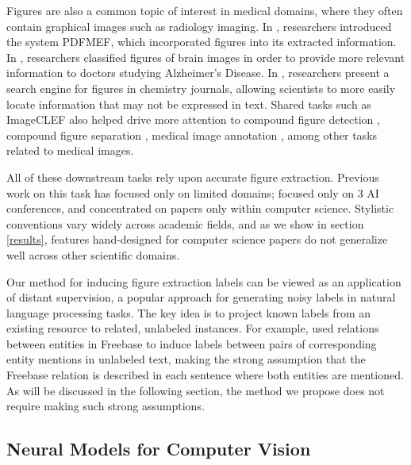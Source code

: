 \documentclass[sigconf]{acmart}
\begin{document}
Figures are also a common topic of interest in medical domains, where they often contain graphical images such as radiology imaging. In \cite{Wu2015PDFMEFAM}, researchers introduced the system PDFMEF, which incorporated figures into its extracted information. In \cite{Tsutsui2016AnalyzingFO}, researchers classified figures of brain images in order to provide more relevant information to doctors studying Alzheimer's Disease. In \cite{Choudhury2013AFS}, researchers present a search engine for figures in chemistry journals, allowing scientists to more easily locate information that may not be expressed in text.
Shared tasks such as ImageCLEF \cite{Herrera2015OverviewOT,Herrera2016OverviewOT} also helped drive more attention to compound figure detection \cite{Yu2017AssemblingDN}, compound figure separation \cite{Tsutsui2017ADD}, medical image annotation \cite{kumar2016adapting}, among other tasks related to medical images.

All of these downstream tasks rely upon accurate figure extraction. Previous work on this task has focused only on limited domains; \cite{pdffigures} focused only on 3 AI conferences, and \cite{pdffigures2} concentrated on papers only within computer science. Stylistic conventions vary widely across academic fields, and as we show in section \ref{results}, features hand-designed for computer science papers do not generalize well across other scientific domains.

Our method for inducing figure extraction labels can be viewed as an application of distant supervision, a popular approach for generating noisy labels in natural language processing tasks.
The key idea is to project known labels from an existing resource to related, unlabeled instances.
For example, \cite{Mintz2009DistantSF} used relations between entities in Freebase \cite{Bollacker2008FreebaseAC} to induce labels between pairs of corresponding entity mentions in unlabeled text, making the strong assumption that the Freebase relation is described in each sentence where both entities are mentioned.
As will be discussed in the following section, the method we propose does not require making such strong assumptions.

\subsection{Neural Models for Computer Vision}
\end{document}
